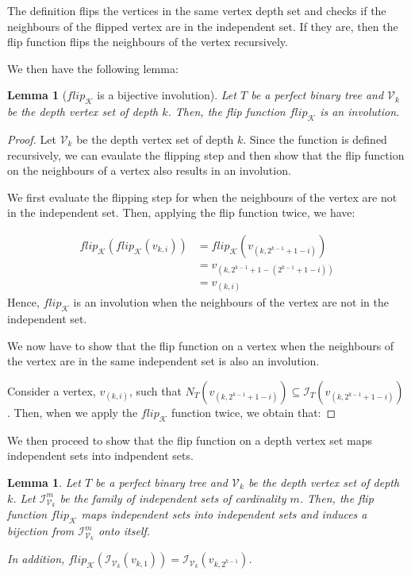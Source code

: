 \documentclass{amsart}
\newtheorem{lemma}[theorem]{Lemma}
\theoremstyle{definition}
\begin{document}
The definition flips the vertices in the same vertex depth set and checks if the neighbours of the flipped vertex are in the independent set. If they are, then the flip function flips the neighbours of the vertex recursively.

We then have the following lemma:

\begin{lemma}[$flip_\mathcal{K}$ is a bijective involution]\label{lemma_flip_bijective_involution}
  Let $T$ be a perfect binary tree and $\mathcal{V}_k$ be the depth vertex set of depth $k$. Then, the flip function $flip_\mathcal{K}$ is an involution.
\end{lemma}
\begin{proof}
  Let $\mathcal{V}_k$ be the depth vertex set of depth $k$. Since the function is defined recursively, we can evaulate the flipping step and then show that the flip function on the neighbours of a vertex also results in an involution.

  We first evaluate the flipping step for when the neighbours of the vertex are not in the independent set. Then, applying the flip function twice, we have:

  \begin{align*}
    flip_\mathcal{K}(flip_\mathcal{K}(v_{k, i})) & = flip_\mathcal{K}(v_{(k, 2^{k-1} + 1 - i)}) \\
                                                 & = v_{(k, 2^{k-1} + 1 - (2^{k-1} + 1 - i))}   \\
                                                 & = v_{(k, i)}
  \end{align*}
  Hence, $flip_\mathcal{K}$ is an involution when the neighbours of the vertex are not in the independent set.

  We now have to show that the flip function on a vertex when the neighbours of the vertex are in the same independent set is also an involution.

  Consider a vertex, $v_{(k, i)}$, such that $N_T(v_{(k, 2^{k-1} + 1 - i)}) \subseteq \mathcal{I}_T(v_{(k, 2^{k-1} + 1 - i)})$. Then, when we apply the $flip_\mathcal{K}$ function twice, we obtain that:

\end{proof}

We then proceed to show that the flip function on a depth vertex set maps independent sets into indpendent sets.

\begin{lemma}\label{lemma_flip_independent_sets}
  Let $T$ be a perfect binary tree and $\mathcal{V}_k$ be the depth vertex set of depth $k$. Let $\mathcal{I}^m_{\mathcal{V}_k}$ be the family of independent sets of cardinality $m$. Then, the flip function $flip_\mathcal{K}$ maps independent sets into independent sets and induces a bijection from $\mathcal{I}^m_{\mathcal{V}_k}$ onto itself.

  In addition, $flip_\mathcal{K}(\mathcal{I}_{\mathcal{V}_k}(v_{k, 1})) = \mathcal{I}_{\mathcal{V}_k}(v_{k, 2^{k-1}})$.
\end{lemma}
\end{document}
